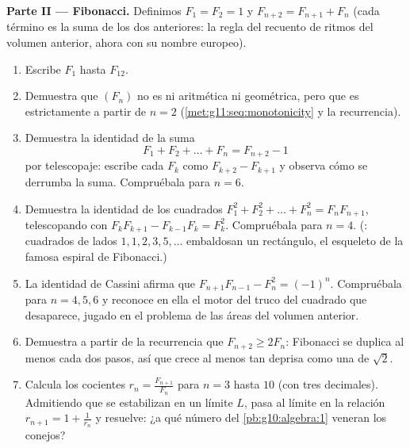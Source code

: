 \begin{problem}
\medskip
\noindent\textbf{Parte II --- Fibonacci.}
Definimos $F_1 = F_2 = 1$ y $F_{n+2} = F_{n+1} + F_n$ (cada término es la
suma de los dos anteriores: la regla del recuento de ritmos del volumen
anterior, ahora con su nombre europeo).
\begin{enumerate}[resume]
  \item Escribe $F_1$ hasta $F_{12}$.
  \item Demuestra que $(F_n)$ no es ni aritmética ni geométrica, pero que
        es estrictamente  a partir de $n = 2$
        (\cref{met:g11:seq:monotonicity} y la recurrencia).
  \item Demuestra la identidad de la suma
        \[
        F_1 + F_2 + \dots + F_n = F_{n+2} - 1
        \]
        por telescopaje: escribe cada $F_k$ como $F_{k+2} - F_{k+1}$ y
        observa cómo se derrumba la suma. Compruébala para $n = 6$.
  \item Demuestra la identidad de los cuadrados
        $F_1^2 + F_2^2 + \dots + F_n^2 = F_n F_{n+1}$, telescopando con
        $F_k F_{k+1} - F_{k-1} F_k = F_k^2$. Compruébala para $n = 4$.
        (: cuadrados de lados $1, 1, 2, 3, 5, \dots$ embaldosan un
        rectángulo, el esqueleto de la famosa espiral de Fibonacci.)
  \item La identidad de Cassini afirma que
        $F_{n+1} F_{n-1} - F_n^2 = (-1)^n$. Compruébala para
        $n = 4, 5, 6$ y reconoce en ella el motor del truco del cuadrado
        que desaparece, jugado en el problema de las áreas del volumen
        anterior.
  \item Demuestra a partir de la recurrencia que $F_{n+2} \geq 2 F_n$:
        Fibonacci se duplica al menos cada dos pasos, así que crece al
        menos tan deprisa como una  de 
        $\sqrt2$.
  \item Calcula los cocientes $r_n = \frac{F_{n+1}}{F_n}$ para $n = 3$
        hasta $10$ (con tres decimales). Admitiendo que se estabilizan en
        un límite $L$, pasa al límite en la relación
        $r_{n+1} = 1 + \frac{1}{r_n}$ y resuelve: ¿a qué número del
        \cref{pb:g10:algebra:1} veneran los conejos?
\end{enumerate}


\end{problem}
